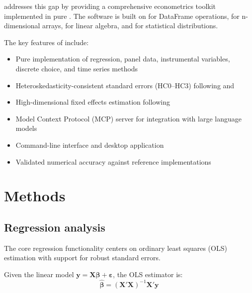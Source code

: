  addresses this gap by providing a comprehensive econometrics
toolkit implemented in pure . The software is built on 
\citep{polars} for DataFrame operations,  \citep{ndarray} for
n-dimensional arrays,  \citep{faer} for linear algebra, and 
\citep{statrs} for statistical distributions.

The key features of  include:
\begin{itemize}
  \item Pure  implementation of regression, panel data, instrumental
    variables, discrete choice, and time series methods
  \item Heteroskedasticity-consistent standard errors (HC0--HC3) following
    \cite{White:1980} and \cite{MacKinnon+White:1985}
  \item High-dimensional fixed effects estimation following \cite{Gaure:2013}
  \item Model Context Protocol (MCP) server for integration with large language
    models \citep{MCP:2024}
  \item Command-line interface and desktop application
  \item Validated numerical accuracy against reference  implementations
\end{itemize}



\section{Methods} \label{sec:methods}


\subsection{Regression analysis} \label{sec:regression}

The core regression functionality centers on ordinary least squares (OLS)
estimation with support for robust standard errors.

Given the linear model $\mathbf{y} = \mathbf{X}\bm{\beta} + \bm{\varepsilon}$,
the OLS estimator is:
\begin{equation}
  \hat{\bm{\beta}} = (\mathbf{X}'\mathbf{X})^{-1}\mathbf{X}'\mathbf{y}
\end{equation}

